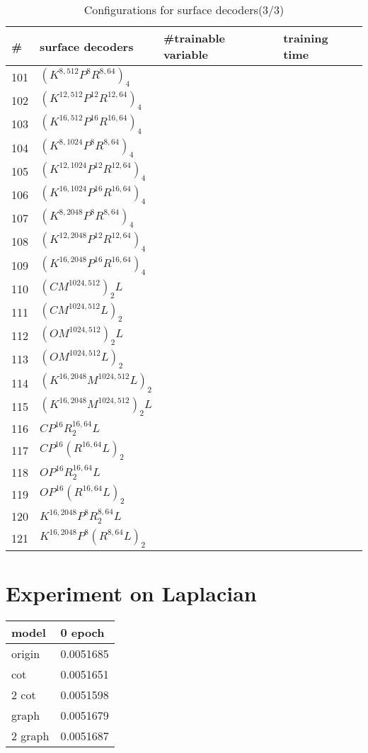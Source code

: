 \begin{appendices}
\begin{table*}
\begin{tabular}{|l | l | l | l }
	\end{tabular}
\end{table*}
\begin{table*}
	\caption{Configurations for surface decoders(3/3)}
	\label{tab:surf_dec3}
	\centering
	\begin{tabular}{| l | l | l | l}
		\hline
		\hline
		\#&surface decoders & \#trainable variable & training time \\
		\hline
		101&$(K^{8,512}P^{8}R^{8,64})_4$ &~&~\\
		102&$(K^{12,512}P^{12}R^{12,64})_4$ &~&~\\
		103&$(K^{16,512}P^{16}R^{16,64})_4$ &~&~\\
		104&$(K^{8,1024}P^{8}R^{8,64})_4$ &~&~\\
		105&$(K^{12,1024}P^{12}R^{12,64})_4$ &~&~\\
		106&$(K^{16,1024}P^{16}R^{16,64})_4$ &~&~\\
		107&$(K^{8,2048}P^{8}R^{8,64})_4$ &~&~\\
		108&$(K^{12,2048}P^{12}R^{12,64})_4$ &~&~\\
		109&$(K^{16,2048}P^{16}R^{16,64})_4$ &~&~\\
		\hline
		110&$(CM^{1024,512})_2L$ &~&~\\
		111&$(CM^{1024,512}L)_2$ &~&~\\
		112&$(OM^{1024,512})_2L$ &~&~\\
		113&$(OM^{1024,512}L)_2$ &~&~\\
		114&$(K^{16,2048}M^{1024,512}L)_2$ &~&~\\
		115&$(K^{16,2048}M^{1024,512})_2L$ &~&~\\
		116&$CP^{16}R^{16,64}_2L$ &~&~\\
		117&$CP^{16}(R^{16,64}L)_2$ &~&~\\
		118&$OP^{16}R^{16,64}_2L$ &~&~\\
		119&$OP^{16}(R^{16,64}L)_2$ &~&~\\
		120&$K^{16,2048}P^{8}R^{8,64}_2L$ &~&~\\
		121&$K^{16,2048}P^{8}(R^{8,64}L)_2$ &~&~\\
	\end{tabular}
\end{table*}
\newpage
\section{Experiment on Laplacian}
\begin{table*}
\label{tab:lpl}
\centering
\begin{tabular}{| l | l |}
model  &   0 epoch   \\
\hline
origin &   0.0051685 \\
cot    &   0.0051651 \\
2 cot   &  0.0051598 \\
graph   &  0.0051679 \\
2 graph &  0.0051687 \\
\end{tabular}
\end{table*}
\newpage

\end{appendices}

